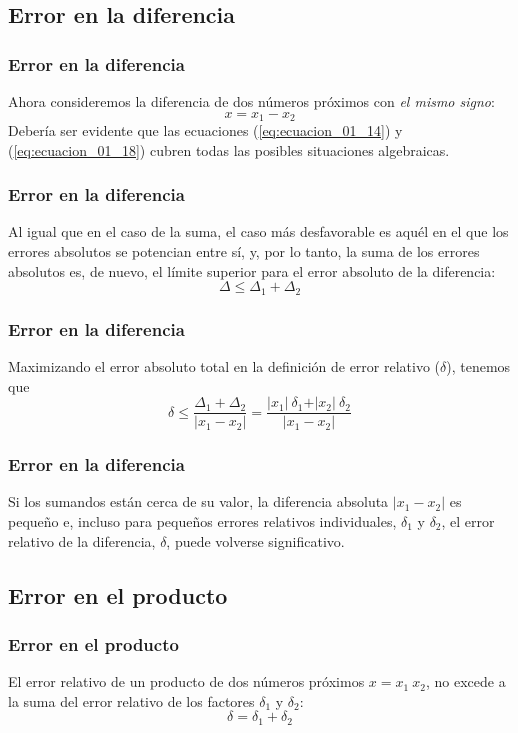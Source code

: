 \subsection{Error en la diferencia}
\begin{frame}
\frametitle{Error en la diferencia}
Ahora consideremos la diferencia de dos números próximos con \emph{el mismo signo}:
\begin{equation}
x = x_{1} - x_{2}
\label{eq:ecuacion_01_18}
\end{equation}
\pause
Debería ser evidente que las ecuaciones (\ref{eq:ecuacion_01_14}) y (\ref{eq:ecuacion_01_18}) cubren todas las posibles situaciones algebraicas.
\end{frame}
\begin{frame}
\frametitle{Error en la diferencia}
Al igual que en el caso de la suma, el caso más desfavorable es aquél en el que los errores absolutos se potencian entre sí, y, por lo tanto, la suma de los errores absolutos es, de nuevo, el límite superior para el error absoluto de la diferencia:
\[ \Delta \leq  \Delta_{1} + \Delta_{2} \]
\end{frame}
\begin{frame}
\frametitle{Error en la diferencia}
Maximizando el error absoluto total en la definición de error relativo ($\delta$), tenemos que
\begin{equation}
\delta \leq \dfrac{\Delta_{1} + \Delta_{2}}{\vert x_{1} - x_{2} \vert} = \dfrac{\vert x_{1} \vert \: \delta_{1} + \vert x_{2} \vert \: \delta_{2}}{\vert x_{1} - x_{2} \vert}
\end{equation}
\end{frame}
\begin{frame}
\frametitle{Error en la diferencia}
Si los sumandos están cerca de su valor, la diferencia absoluta $\vert x_{1} - x_{2} \vert$ es pequeño e, incluso para pequeños errores relativos individuales, $\delta_{1}$ y $\delta_{2}$, el error relativo de la diferencia, $\delta$, puede volverse significativo.
\end{frame}
\subsection{Error en el producto}
\begin{frame}
\frametitle{Error en el producto}
El error relativo de un producto de dos números próximos $x = x_{1} \: x_{2}$, no excede a la suma del error relativo de los factores $\delta_{1}$ y $\delta_{2}$:
\begin{equation}
\delta = \delta_{1} + \delta_{2}
\label{eq:ecuacion_01_20}
\end{equation}
\end{frame}

